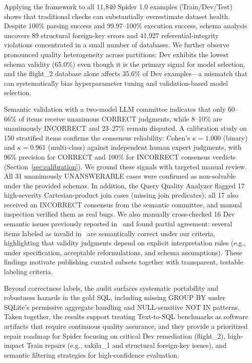\documentclass[print]{einformatica}
\begin{document}
Applying the framework to all 11,840 Spider 1.0 examples (Train/Dev/Test) shows that traditional checks can substantially overestimate dataset health. Despite 100\% parsing success and 99.97--100\% execution success, schema analysis uncovers 89 structural foreign-key errors and 41,927 referential-integrity violations concentrated in a small number of databases. We further observe pronounced quality heterogeneity across partitions: Dev exhibits the lowest schema validity (65.0\%) even though it is the primary signal for model selection, and the flight\_2 database alone affects 35.6\% of Dev examples---a mismatch that can systematically bias hyperparameter tuning and validation-based model selection.

Semantic validation with a two-model LLM committee indicates that only 60--66\% of items receive unanimous CORRECT judgments, while 8--10\% are unanimously INCORRECT and 23--27\% remain disputed. A calibration study on 150 stratified items confirms the consensus reliability: Cohen's $\kappa = 1.000$ (binary) and $\kappa = 0.961$ (multi-class) against independent human expert judgments, with 96\% precision for CORRECT and 100\% for INCORRECT consensus verdicts (Section~\ref{sec:calibration}). We ground these signals with targeted manual review. All 31 unanimously UNANSWERABLE cases were confirmed as non-solvable under the provided schemas. In addition, the Query Quality Analyzer flagged 17 high-severity Cartesian-product join cases (missing join predicates); all 17 also received an INCORRECT consensus from the semantic committee, and manual inspection verified them as real bugs. We also manually cross-checked 16 Dev semantic issues previously reported in~\cite{liu2025nl2sqlbugs} and found partial agreement: several items labeled as invalid in~\cite{liu2025nl2sqlbugs} are semantically correct under our criteria, highlighting that validity judgments depend on explicit interpretation rules (e.g., under specification, acceptable reformulations, and schema assumptions). These findings motivate publishing curated subsets together with transparent, testable labeling criteria.

Beyond correctness labels, the audit surfaces systematic portability and robustness hazards in the gold SQL, including missing GROUP BY under SQLite's permissive aggregate handling and NULL-sensitive NOT IN patterns. Taken together, the results support treating Text-to-SQL benchmarks as software artifacts that require continuous quality assurance, and they provide a prioritized repair roadmap for Spider focusing on critical Dev remediation (flight\_2), high-impact Train repairs (e.g., sakila\_1 and structural foreign-key issues), and semantic filtering strategies for high-confidence evaluation.
\end{document}
